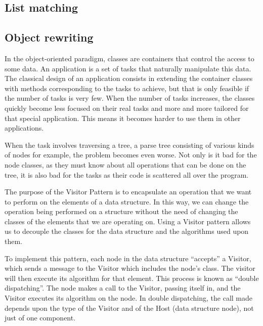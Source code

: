 
\subsection{List matching}




\subsection{Object rewriting}

In the object-oriented paradigm, classes are containers that control
the access to some data. 
An application is a set of tasks that naturally manipulate this data.
The classical design of an application consists in extending 
the container classes with methods corresponding to the tasks to
achieve, but that is only feasible if the number of tasks is very few.
When the number of tasks increases, the classes quickly become less
focused on their real tasks and more and more tailored for that
special application. This means it becomes harder to use them  in
other applications.  

When the task involves traversing a tree, a parse tree consisting of
various kinds of nodes for example, the problem becomes even
worse. Not only is it bad for the node classes, as they must know
about all operations that can be done  on the tree, it is also bad for
the tasks as their code is scattered all over the program. 

The purpose of the Visitor Pattern is to encapsulate an operation that
we want to perform on the elements of a data structure. In this
way, we can change the operation being performed on a structure
without the need of changing the classes of the elements that we are
operating on. Using a Visitor pattern allows us to decouple the
classes for the data structure and the algorithms used upon them.

To implement this pattern, each node in the data structure ``accepts''
a Visitor, which sends a message to the Visitor which includes the
node's class. The visitor will then execute its algorithm for that
element. This process is known as ``double dispatching''. The node makes
a call to the Visitor, passing itself in, and the Visitor executes its
algorithm on the node. In double dispatching, the call made depends
upon the type of the Visitor and of the Host (data structure node),
not just of one component. 

